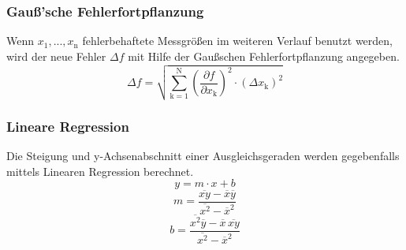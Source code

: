 \subsubsection{Gauß'sche Fehlerfortpflanzung}
Wenn $x_\text{1}, ..., x_\text{n}$ fehlerbehaftete Messgrößen im weiteren Verlauf benutzt werden, wird der neue Fehler $\Delta f$ mit Hilfe der Gaußschen Fehlerfortpflanzung angegeben.
\begin{equation}
	\Delta f = \sqrt{\sum_{\text{k}=1}^\text{N} \left( \frac{ \partial f}{\partial x_\text{k}} \right) ^2 \cdot (\Delta x_\text{k})^2}
	\label{eqn:var}
\end{equation}

\subsubsection{Lineare Regression}
Die Steigung und y-Achsenabschnitt einer Ausgleichsgeraden werden gegebenfalls mittels Linearen Regression berechnet.
\begin{equation}
	y = m \cdot x + b
	\label{eqn:reg}
\end{equation}
\begin{equation}
	m = \frac{ \overline{xy} - \overline{x} \overline{y} } {\overline{x^2} - \overline{x}^2}
	\label{eqn:reg_m}
\end{equation}
\begin{equation}
	b = \frac{ \overline{x^2}\overline{y} - \overline{x} \, \overline{xy}} { \overline{x^2} - \overline{x}^2}
	\label{eqn:reg_b}
\end{equation}
